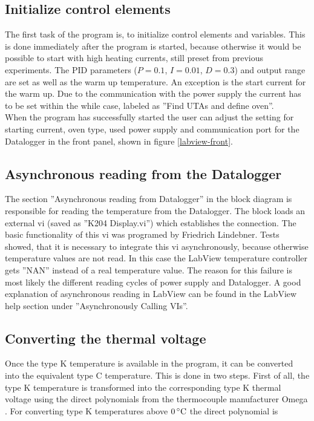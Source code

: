 \documentclass[parskip,12pt,headsepline,a4paper] {scrbook}
\begin{document}
\subsection{Initialize control elements}
\vspace{-1\baselineskip}
The first task of the program is, to initialize control elements and variables. This is done immediately after the program is started, because otherwise it would be possible to start with high heating currents, still preset from previous experiments. The PID parameters ($P = 0.1$, $I = 0.01$, $D = 0.3$) and output range are set as well as the warm up temperature. An exception is the start current for the warm up. Due to the communication with the power supply the current has to be set within the while case, labeled as ''Find UTAs and define oven''. \\
When the program has successfully started the user can adjust the setting for starting current, oven type, used power supply and communication port for the Datalogger in the front panel, shown in figure \ref{labview-front}.


\subsection{Asynchronous reading from the Datalogger}
\vspace{-1\baselineskip}
The section ''Asynchronous reading from Datalogger'' in the block diagram is responsible for reading the temperature from the Datalogger. The block loads an external vi (saved as ''K204 Display.vi'') which establishes the connection. The basic functionality of this vi was programed by Friedrich Lindebner. Tests showed, that it is necessary to integrate this vi asynchronously, because otherwise temperature values are not read. In this case the LabView temperature controller gets ''NAN'' instead of a real temperature value. The reason for this failure is most likely the different reading cycles of power supply and Datalogger. A good explanation of asynchronous reading in LabView can be found in the LabView help section under ''Asynchronously Calling VIs''.

\subsection{Converting the thermal voltage}
\vspace{-1\baselineskip}
Once the type K temperature is available in the program, it can be converted into the equivalent type C temperature. This is done in two steps. First of all, the type K temperature is transformed into the corresponding type K thermal voltage using the direct polynomials from the thermocouple manufacturer Omega \cite{omega-polynomials}. For converting type K temperatures above $\unit[0]{^\circ C}$ the direct polynomial is
\end{document}
